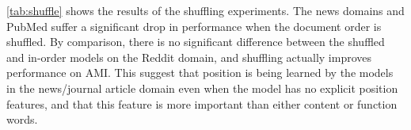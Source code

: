 \autoref{tab:shuffle} shows the results
of the shuffling experiments. 
The news domains and PubMed suffer a significant drop in performance 
when the document order is shuffled. By comparison, there is no significant difference between the shuffled and in-order models on 
the Reddit domain, and shuffling actually improves performance on AMI.
This suggest that position 
is being learned by the models in the news/journal article domain even when 
the model has no explicit position features, and that this feature is more 
important than either content or function words.











